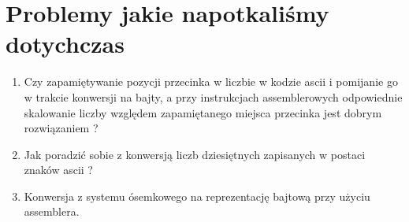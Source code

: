 \documentclass{article}
\begin{document}
\section{Problemy jakie napotkaliśmy dotychczas}
\begin{enumerate}
    \item Czy zapamiętywanie pozycji przecinka w liczbie w kodzie ascii i pomijanie go w trakcie konwersji na bajty, a przy instrukcjach assemblerowych odpowiednie skalowanie liczby względem zapamiętanego miejsca przecinka jest dobrym rozwiązaniem ?
    \item Jak poradzić sobie z konwersją liczb dziesiętnych zapisanych w postaci znaków ascii ? 
    \item Konwersja z systemu ósemkowego na reprezentację bajtową przy użyciu assemblera.
\end{enumerate}
\end{document}
